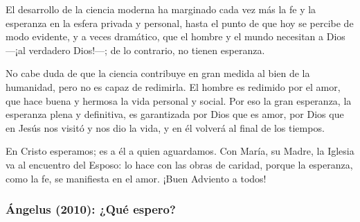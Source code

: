 \begin{body}
	El desarrollo de la ciencia moderna ha marginado cada vez más la fe y la esperanza en la esfera privada y personal, hasta el punto de que hoy se percibe de modo evidente, y a veces dramático, que el hombre y el mundo necesitan a Dios ---¡al verdadero Dios!---; de lo contrario, no tienen esperanza. 
	
	No cabe duda de que la ciencia contribuye en gran medida al bien de la humanidad, pero no es capaz de redimirla. El hombre es redimido por el amor, que hace buena y hermosa la vida personal y social. Por eso la gran esperanza, la esperanza plena y definitiva, es garantizada por Dios que es amor, por Dios que en Jesús nos visitó y nos dio la vida, y en él volverá al final de los tiempos. 
	
	En Cristo esperamos; es a él a quien aguardamos. Con María, su Madre, la Iglesia va al encuentro del Esposo: lo hace con las obras de caridad, porque la esperanza, como la fe, se manifiesta en el amor. ¡Buen Adviento a todos!
\end{body}

\newpage
\subsubsection{Ángelus (2010): ¿Qué espero?}


